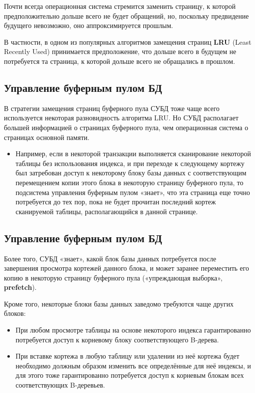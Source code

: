 \documentclass[a4paper,12pt]{article}
\begin{document}
Почти всегда операционная система стремится заменить страницу, к которой предположительно дольше всего не будет обращений, но, поскольку предвидение будущего невозможно, оно аппроксимируется прошлым.

В частности, в одном из популярных алгоритмов замещения страниц \textbf{LRU} (Least Recently Used) принимается предположение, что дольше всего в будущем не потребуется та страница, к которой дольше всего не обращались в прошлом.

\subsection{Управление буферным пулом БД}

В стратегии замещения страниц буферного пула СУБД тоже чаще всего используется некоторая разновидность алгоритма LRU. Но СУБД располагает большей информацией о страницах буферного пула, чем операционная система о страницах основной памяти.

\begin{itemize}
    \item Например, если в некоторой транзакции выполняется сканирование некоторой таблицы без использования индекса, и при переходе к следующему кортежу был затребован доступ к некоторому блоку базы данных с соответствующим перемещением копии этого блока в некоторую страницу буферного пула, то подсистема управления буферным пулом «знает», что эта страница еще точно потребуется до тех пор, пока не будет прочитан последний кортеж сканируемой таблицы, располагающийся в данной странице.
\end{itemize}

\subsection{Управление буферным пулом БД}

Более того, СУБД «знает», какой блок базы данных потребуется после завершения просмотра кортежей данного блока, и может заранее переместить его копию в некоторую страницу буферного пула («упреждающая выборка», \textbf{prefetch}).

Кроме того, некоторые блоки базы данных заведомо требуются чаще других блоков:
\begin{itemize}
    \item При любом просмотре таблицы на основе некоторого индекса гарантированно потребуется доступ к корневому блоку соответствующего B-дерева.
    \item При вставке кортежа в любую таблицу или удалении из неё кортежа будет необходимо должным образом изменить все определённые для неё индексы, и для этого тоже гарантированно потребуется доступ к корневым блокам всех соответствующих B-деревьев.
\end{itemize}
\end{document}
